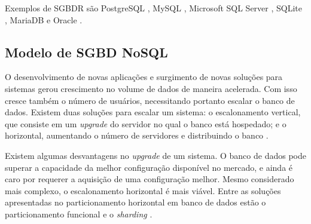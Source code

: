 Exemplos de SGBDR são PostgreSQL \cite{postgres2018r}, MySQL \cite{mysql2018r}, Microsoft SQL Server \cite{microsoft2018r}, SQLite \cite{lite2018r}, MariaDB \cite{maria2018r} e Oracle \cite{oracle2018r}. 

\subsection{Modelo de SGBD NoSQL}





O desenvolvimento de novas aplicações e surgimento de novas soluções 
para sistemas gerou crescimento no volume de dados de maneira acelerada. 
Com isso cresce também o número de usuários, necessitando portanto escalar 
o banco de dados. Existem duas soluções para escalar um sistema: o 
escalonamento vertical, que consiste em um \textit{upgrade} do servidor no 
qual o banco está hospedado; e o horizontal, aumentando o número de 
servidores e distribuindo o banco \cite{pritchett2008base, sharding2018educative}. 

Existem algumas desvantagens no \textit{upgrade} de um sistema. 
O banco de dados pode superar a capacidade da melhor configuração 
disponível no mercado, e ainda é caro por requerer a aquisição de 
uma configuração melhor. Mesmo considerado mais complexo, o 
escalonamento horizontal é mais viável. Entre as soluções apresentadas 
no particionamento horizontal em banco de dados estão o particionamento funcional e o 
\textit{sharding} \cite{pritchett2008base}. 


